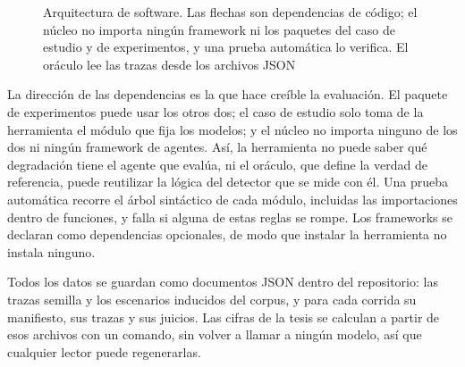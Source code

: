 \begin{figure}[H]
  \caption{Arquitectura de software. Las flechas son dependencias de código; el núcleo no importa ningún framework ni los paquetes del caso de estudio y de experimentos, y una prueba automática lo verifica. El oráculo lee las trazas desde los archivos JSON}
  \label{fig:arquitectura}
\end{figure}

La dirección de las dependencias es la que hace creíble la evaluación. El paquete de experimentos puede usar los otros dos; el caso de estudio solo toma de la herramienta el módulo que fija los modelos; y el núcleo no importa ninguno de los dos ni ningún framework de agentes. Así, la herramienta no puede saber qué degradación tiene el agente que evalúa, ni el oráculo, que define la verdad de referencia, puede reutilizar la lógica del detector que se mide con él. Una prueba automática recorre el árbol sintáctico de cada módulo, incluidas las importaciones dentro de funciones, y falla si alguna de estas reglas se rompe. Los frameworks se declaran como dependencias opcionales, de modo que instalar la herramienta no instala ninguno.
\par
Todos los datos se guardan como documentos JSON dentro del repositorio: las trazas semilla y los escenarios inducidos del corpus, y para cada corrida su manifiesto, sus trazas y sus juicios. Las cifras de la tesis se calculan a partir de esos archivos con un comando, sin volver a llamar a ningún modelo, así que cualquier lector puede regenerarlas.
\par

